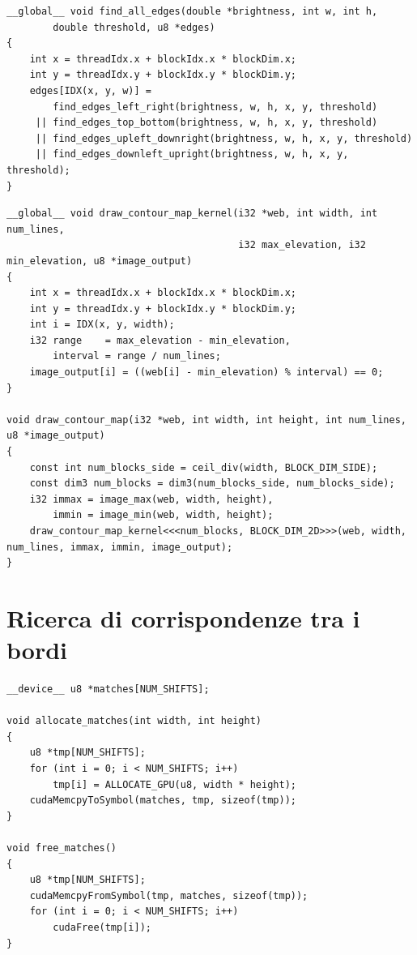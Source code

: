 \documentclass[12pt,a4paper,openright,twoside]{report}
\begin{document}
\begin{lstlisting}[style=mystyle]
__global__ void find_all_edges(double *brightness, int w, int h,
        double threshold, u8 *edges)
{
    int x = threadIdx.x + blockIdx.x * blockDim.x;
    int y = threadIdx.y + blockIdx.y * blockDim.y;
    edges[IDX(x, y, w)] =
        find_edges_left_right(brightness, w, h, x, y, threshold)
     || find_edges_top_bottom(brightness, w, h, x, y, threshold)
     || find_edges_upleft_downright(brightness, w, h, x, y, threshold)
     || find_edges_downleft_upright(brightness, w, h, x, y, threshold);
}
\end{lstlisting}

\begin{lstlisting}[style=mystyle]
__global__ void draw_contour_map_kernel(i32 *web, int width, int num_lines,
                                        i32 max_elevation, i32 min_elevation, u8 *image_output)
{
    int x = threadIdx.x + blockIdx.x * blockDim.x;
    int y = threadIdx.y + blockIdx.y * blockDim.y;
    int i = IDX(x, y, width);
    i32 range    = max_elevation - min_elevation,
        interval = range / num_lines;
    image_output[i] = ((web[i] - min_elevation) % interval) == 0;
}

void draw_contour_map(i32 *web, int width, int height, int num_lines, u8 *image_output)
{
    const int num_blocks_side = ceil_div(width, BLOCK_DIM_SIDE);
    const dim3 num_blocks = dim3(num_blocks_side, num_blocks_side);
    i32 immax = image_max(web, width, height),
        immin = image_min(web, width, height);
    draw_contour_map_kernel<<<num_blocks, BLOCK_DIM_2D>>>(web, width, num_lines, immax, immin, image_output);
}
\end{lstlisting}

\section{Ricerca di corrispondenze tra i bordi}

\begin{lstlisting}[style=mystyle]
__device__ u8 *matches[NUM_SHIFTS];

void allocate_matches(int width, int height)
{
    u8 *tmp[NUM_SHIFTS];
    for (int i = 0; i < NUM_SHIFTS; i++)
        tmp[i] = ALLOCATE_GPU(u8, width * height);
    cudaMemcpyToSymbol(matches, tmp, sizeof(tmp));
}

void free_matches()
{
    u8 *tmp[NUM_SHIFTS];
    cudaMemcpyFromSymbol(tmp, matches, sizeof(tmp));
    for (int i = 0; i < NUM_SHIFTS; i++)
        cudaFree(tmp[i]);
}
\end{lstlisting}
\end{document}
